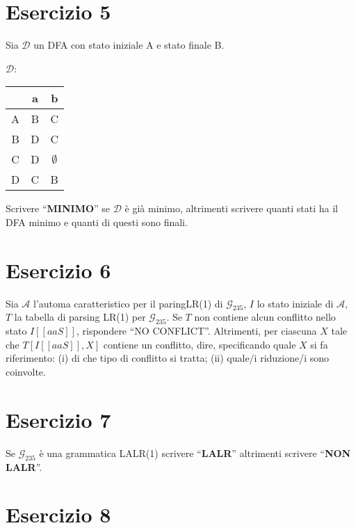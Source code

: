 \documentclass[a4paper]{article}
\begin{document}
\section*{Esercizio 5}

Sia $\mathcal{D}$ un DFA con stato iniziale A e stato finale B.
\begin{center}
  $\mathcal{D}$:
  \begin{tabular}{|c|c|c|}
    \hline
    & a & b\\
    \hline
    A & B & C\\
    \hline
    B & D & C\\
    \hline
    C & D & $\emptyset$\\
    \hline
    D & C & B\\
    \hline
  \end{tabular}
\end{center}
Scrivere ``\textbf{MINIMO}'' se $\mathcal{D}$ è già minimo, altrimenti scrivere quanti stati ha il DFA minimo e quanti di questi sono finali.

\section*{Esercizio 6}

Sia $\mathcal{A}$ l'automa caratteristico per il paringLR(1) di $\mathcal{G}_{235}$, $I$ lo stato iniziale di $\mathcal{A}$, $T$ la tabella di parsing LR(1) per $\mathcal{G}_{235}$. Se $T$ non contiene alcun conflitto nello stato $I[\![aaS]\!]$, rispondere ``NO CONFLICT''. Altrimenti, per ciascuna $X$ tale che $T[I[\![aaS]\!], X]$ contiene un conflitto, dire, specificando quale $X$ si fa riferimento: (i) di che tipo di conflitto si tratta; (ii) quale/i riduzione/i sono coinvolte.

\section*{Esercizio 7}

Se $\mathcal{G}_{235}$ è una grammatica LALR(1) scrivere ``\textbf{LALR}'' altrimenti scrivere ``\textbf{NON LALR}''.

\section*{Esercizio 8}
\end{document}
